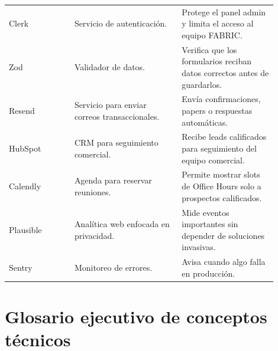 \documentclass[11pt,letterpaper]{article}
\begin{document}
\begin{longtable}{p{0.22\linewidth}p{0.36\linewidth}p{0.32\linewidth}}
Clerk & Servicio de autenticaci\'on. & Protege el panel admin y limita el acceso al equipo FABRIC. \\
Zod & Validador de datos. & Verifica que los formularios reciban datos correctos antes de guardarlos. \\
Resend & Servicio para enviar correos transaccionales. & Env\'ia confirmaciones, papers o respuestas autom\'aticas. \\
HubSpot & CRM para seguimiento comercial. & Recibe leads calificados para seguimiento del equipo comercial. \\
Calendly & Agenda para reservar reuniones. & Permite mostrar slots de Office Hours solo a prospectos calificados. \\
Plausible & Anal\'itica web enfocada en privacidad. & Mide eventos importantes sin depender de soluciones invasivas. \\
Sentry & Monitoreo de errores. & Avisa cuando algo falla en producci\'on. \\
\bottomrule
\end{longtable}

\section{Glosario ejecutivo de conceptos t\'ecnicos}
\end{document}
